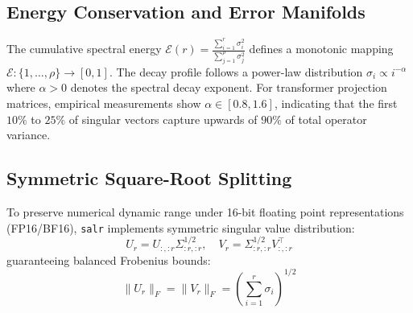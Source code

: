 \subsection{Energy Conservation and Error Manifolds}
The cumulative spectral energy $\mathcal{E}(r) = \frac{\sum_{i=1}^r \sigma_i^2}{\sum_{j=1}^\rho \sigma_j^2}$ defines a monotonic mapping $\mathcal{E}: \{1, \dots, \rho\} \to [0, 1]$. The decay profile follows a power-law distribution $\sigma_i \propto i^{-\alpha}$ where $\alpha > 0$ denotes the spectral decay exponent. For transformer projection matrices, empirical measurements show $\alpha \in [0.8, 1.6]$, indicating that the first $10\%$ to $25\%$ of singular vectors capture upwards of $90\%$ of total operator variance.

\subsection{Symmetric Square-Root Splitting}
To preserve numerical dynamic range under 16-bit floating point representations (FP16/BF16), \texttt{salr} implements symmetric singular value distribution:
\[
U_r = U_{:, :r} \Sigma_{:r, :r}^{1/2}, \quad V_r = \Sigma_{:r, :r}^{1/2} V_{:, :r}^\top
\]
guaranteeing balanced Frobenius bounds:
\[
\|U_r\|_F = \|V_r\|_F = \left( \sum_{i=1}^{r} \sigma_i \right)^{1/2}
\]
